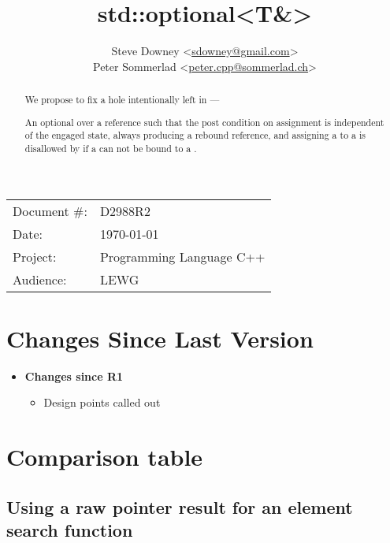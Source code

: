 \documentclass[a4paper,10pt,oneside,openany,final,article]{memoir}
\begin{document}
\title{std::optional<T\&>}
\author{
  Steve Downey \small<\href{mailto:sdowney@gmail.com}{sdowney@gmail.com}> \\
  Peter Sommerlad \small<\href{mailto:peter.cpp@sommerlad.ch}{peter.cpp@sommerlad.ch}> \\
}
\date{} %
\maketitle

\begin{flushright}
  \begin{tabular}{ll}
    Document \#: & D2988R2 \\
    Date: & \today \\
    Project: & Programming Language C++ \\
    Audience: & LEWG
  \end{tabular}
\end{flushright}

\begin{abstract}
  We propose to fix a hole intentionally left in  ---

  An optional over a reference such that the post condition on assignment is independent of the engaged state, always producing a rebound reference, and assigning a  to a  is disallowed by  if a  can not be bound to a .
\end{abstract}

\tableofcontents*

\chapter*{Changes Since Last Version}

\begin{itemize}
\item \textbf{Changes since R1}
  \begin{itemize}
  \item Design points called out
  \end{itemize}
\end{itemize}

\chapter{Comparison table}
\section{Using a raw pointer result for an element search function}
\end{document}
